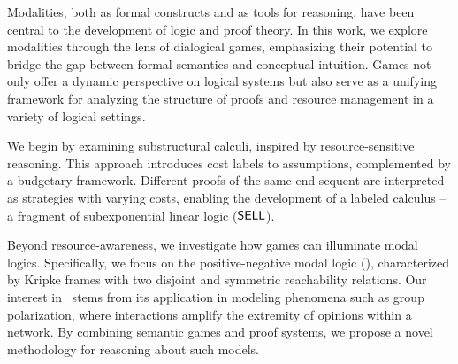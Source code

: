 


Modalities, both as formal constructs and as tools for reasoning, have been central to the development of logic and proof theory. In this work, we explore modalities through the lens of dialogical games, emphasizing their potential to bridge the gap between formal semantics and conceptual intuition. Games not only offer a dynamic perspective on logical systems but also serve as a unifying framework for analyzing the structure of proofs and resource management in a variety of logical settings.

We begin by examining substructural calculi, inspired by resource-sensitive reasoning. This approach introduces cost labels to assumptions, complemented by a budgetary framework. Different proofs of the same end-sequent are interpreted as strategies with varying costs, enabling the development of a labeled calculus -- a fragment of subexponential linear logic ($\textsf{SELL}$). 

Beyond resource-awareness, we investigate how games can illuminate modal logics. Specifically, we focus on the positive-negative modal logic (\PNL), characterized by Kripke frames with two disjoint and symmetric reachability relations. Our interest in \PNL\ stems from its application in modeling phenomena such as group polarization, where interactions amplify the extremity of opinions within a network. By combining semantic games and proof systems, we propose a novel methodology for reasoning about such models.

